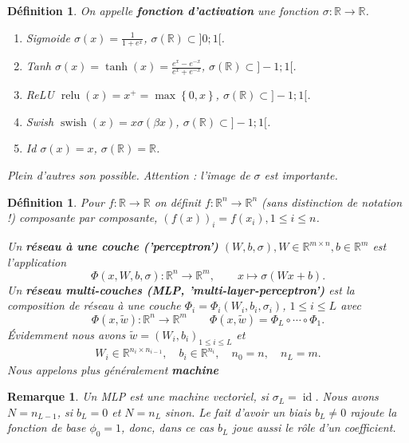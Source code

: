 \documentclass[11pt,a4paper]{article}
\newcommand{\R}{\mathbb R}
\newcommand{\Set}[1]{\left\{#1\right\}}
\newcommand{\id}{\operatorname{id}}
\newtheorem{remark}[theorem]{Remarque}
\newtheorem{definition}[theorem]{Définition}
\begin{document}
%
%
\begin{definition}\label{definition:}
On appelle \textbf{fonction d'activation} une fonction $\sigma:\R\to\R$.
\begin{enumerate}
\item Sigmoide $\sigma(x) = \frac{1}{1+e^x}$, \quad $\sigma(\R) \subset ]0;1[$.
\item Tanh $\sigma(x) = \tanh(x) = \frac{e^x-e^{-x}}{e^x+e^{-x}}$, \quad $\sigma(\R) \subset ]-1;1[$.
\item ReLU $\operatorname{relu}(x) = x^+ = \max\Set{0,x}$, \quad $\sigma(\R) \subset ]-1;1[$.
\item Swish $\operatorname{swish}(x) = x\sigma(\beta x)$, \quad $\sigma(\R) \subset ]-1;1[$.
\item Id $\sigma(x) = x$, \quad $\sigma(\R) =\R$.
\end{enumerate}
Plein d'autres son possible. Attention : l'image de $\sigma$ est importante.
\end{definition}
%
%
\begin{definition}\label{definition:}
Pour $f:\R\to \R$ on définit $f:\R^n\to\R^n$ (sans distinction de notation !) composante par composante, $\left(f(x)\right)_i = f(x_i), 1\le i\le n$. 

Un \textbf{réseau à une couche ('perceptron')} $(W,b,\sigma), W\in \R^{m\times n}, b\in \R^m$ est l'application 
%
\begin{equation}\label{equation:}
\Phi(x, W,b,\sigma):\R^n\to\R^m,\qquad x \mapsto \sigma(W x + b).
\end{equation}
%
Un \textbf{réseau multi-couches (MLP, 'multi-layer-perceptron')} est la composition de réseau à une couche $\Phi_i=\Phi_i(W_i,b_i,\sigma_i)$, $1\le i\le L$ avec 
%
\begin{equation}\label{equation:}
\Phi(x, \tilde w):\R^n\to \R^m\qquad \Phi(x, \tilde w) = \Phi_L \circ \cdots \circ \Phi_1.
\end{equation}
%
Évidemment nous avons $\tilde w = (W_i,b_i)_{1\le i\le L}$ et
\begin{align*}
W_i\in \R^{n_i\times n_{i-1}},\quad b_i\in \R^{n_i},\quad n_0=n,\quad n_L = m.
\end{align*}
%
Nous appelons plus généralement \textbf{machine} 
\end{definition}
%
%
\begin{remark}\label{remark:}
Un MLP est une machine vectoriel, si $\sigma_L=\id$. Nous avons $N=n_{L-1}$, si $b_L=0$ et  $N=n_{L}$ sinon.
Le fait d'avoir un biais $b_L\ne0$ rajoute la fonction de base $\phi_0=1$, donc, dans ce cas $b_L$ joue aussi le rôle d'un coefficient.
\end{remark}
\end{document}
